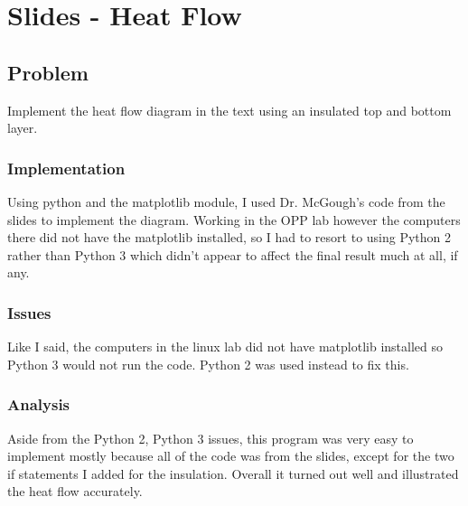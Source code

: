 
\chapter{Slides - Heat Flow}

\section{Problem}

	Implement the heat flow diagram in the text using an insulated top and bottom layer.  

\subsection{Implementation}

	Using python and the matplotlib module, I used Dr. McGough's code from the slides to implement the diagram.  Working in the OPP lab however the computers there did not have the matplotlib installed, so I had to resort to using Python 2 rather than Python 3 which didn't appear to affect the final result much at all, if any.

\subsection{Issues}

	Like I said, the computers in the linux lab did not have matplotlib installed so Python 3 would not run the code.  Python 2 was used instead to fix this.

\subsection{Analysis}

	Aside from the Python 2, Python 3 issues, this program was very easy to implement mostly because all of the code was from the slides, except for the two if statements I added for the insulation.  Overall it turned out well and illustrated the heat flow accurately.